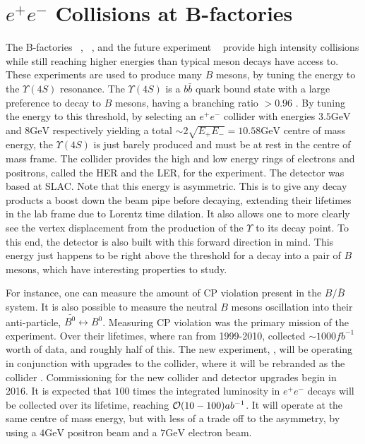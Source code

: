 \section{$e^+ e^-$ Collisions at B-factories}
\label{sec:ee_experiment}
The B-factories \babar~\cite{Boutigny:1995ib}, \belle~\cite{Cheng:1995im}, and the future experiment \belletwo~\cite{Abe:2010gxa} provide high intensity collisions while still reaching higher energies than typical meson decays have access to.
These experiments are used to produce many $B$ mesons, by tuning the energy to the $\Upsilon(4S)$ resonance.
The $\Upsilon(4S)$ is a $b\bar{b}$ quark bound state with a large preference to decay to $B$ mesons, having a branching ratio $> 0.96$ \cite{Agashe:2014kda}.
By tuning the energy to this threshold, by selecting an $e^+ e^-$ collider with energies $3.5\textrm{GeV}$ and $8\textrm{GeV}$ respectively yielding a total $\sim 2\sqrt{E_+ E_-} = 10.58\textrm{GeV}$ centre of mass energy, the $\Upsilon(4S)$ is just barely produced and must be at rest in the centre of mass frame.
The \kekb collider provides the high and low energy rings of electrons and positrons, called the HER and the LER, for the \belle experiment.
The \babar detector was based at SLAC.
Note that this energy is asymmetric.
This is to give any decay products a boost down the beam pipe before decaying, extending their lifetimes in the lab frame due to Lorentz time dilation.
It also allows one to more clearly see the vertex displacement from the production of the $\Upsilon$ to its decay point.
To this end, the detector is also built with this forward direction in mind.
This energy just happens to be right above the threshold for a decay into a pair of $B$ mesons, which have interesting properties to study.

For instance, one can measure the amount of CP violation present in the $B/\bar{B}$ system.
It is also possible to measure the neutral $B$ mesons oscillation into their anti-particle, $\bar{B^0} \leftrightarrow B^0$.
Measuring CP violation was the primary mission of the \babar experiment.
Over their lifetimes, where \belle ran from 1999-2010, \belle collected $\sim 1000fb^{-1}$ worth of data, and \babar roughly half of this.
The new experiment, \belletwo, will be operating in conjunction with upgrades to the \kekb collider, where it will be rebranded as the \superkekb collider \cite{Akeroyd:2004mj}.
Commissioning for the new collider and detector upgrades begin in 2016.
It is expected that $100$ times the integrated luminosity in $e^+ e^-$ decays will be collected over its lifetime, reaching $\operatorname{\mathcal{O}}(10-100)ab^{-1}$.
It will operate at the same centre of mass energy, but with less of a trade off to the asymmetry, by using a $4\textrm{GeV}$ positron beam and a $7\textrm{GeV}$ electron beam.


